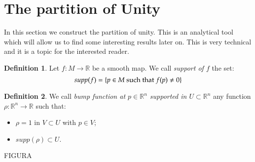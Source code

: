 \documentclass[12pt,a4paper]{report}
\theoremstyle{definition}
\newtheorem{Def}{Definition}[chapter]
\theoremstyle{Theorem}
\theoremstyle{break}
\theoremstyle{definition}
\begin{document}
		\section{The partition of Unity}
			In this section we construct the partition of unity. This is an analytical tool which will allow us to find some interesting results later on. This is very technical and it is a topic for the interested reader.
			\begin{Def}
				 Let $f:M\rightarrow \mathbb{R}$ be a smooth map. We call \textit{support of $f$} the set:
				 $$supp(f)=\{p\in M\hbox{ such that } f(p)\neq 0\}$$
			\end{Def}
			\begin{Def}
				We call \textit{bump function at $p\in\mathbb{R}^n$ supported in $U\subset \mathbb{R}^n$} any function $\rho:\mathbb{R}^n\rightarrow \mathbb{R}$ such that:
				\begin{itemize}
					\item $\rho=1$ in $V\subset U$ with $p\in V$;
					\item $supp(\rho)\subset U$.
				\end{itemize}
			\end{Def}
			FIGURA\\
			\\
\end{document}

